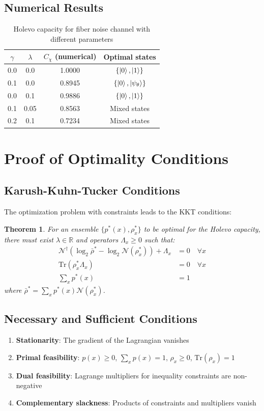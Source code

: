\documentclass[12pt]{article}
\begin{document}
\subsection{Numerical Results}
\begin{table}[h]
\centering
\begin{tabular}{|c|c|c|c|}
\hline
$\gamma$ & $\lambda$ & $C_{\chi}$ (numerical) & Optimal states \\
\hline
0.0 & 0.0 & 1.0000 & $\{\ket{0}, \ket{1}\}$ \\
0.1 & 0.0 & 0.8945 & $\{\ket{0}, \ket{\psi_\theta}\}$ \\
0.0 & 0.1 & 0.9886 & $\{\ket{0}, \ket{1}\}$ \\
0.1 & 0.05 & 0.8563 & Mixed states \\
0.2 & 0.1 & 0.7234 & Mixed states \\
\hline
\end{tabular}
\caption{Holevo capacity for fiber noise channel with different parameters}
\end{table}

\section{Proof of Optimality Conditions}

\subsection{Karush-Kuhn-Tucker Conditions}
The optimization problem with constraints leads to the KKT conditions:

\newtheorem{theorem}{Theorem}
\begin{theorem}
For an ensemble $\{p^*(x), \rho_x^*\}$ to be optimal for the Holevo capacity, there must exist $\lambda \in \mathbb{R}$ and operators $\Lambda_x \geq 0$ such that:
\begin{align}
\mathcal{N}^\dagger\left(\log_2 \bar{\rho}^* - \log_2 \mathcal{N}(\rho_x^*) \right) + \Lambda_x &= 0 \quad \forall x \\
\text{Tr}(\rho_x^* \Lambda_x) &= 0 \quad \forall x \\
\sum_x p^*(x) &= 1
\end{align}
where $\bar{\rho}^* = \sum_x p^*(x) \mathcal{N}(\rho_x^*)$.
\end{theorem}

\subsection{Necessary and Sufficient Conditions}
\begin{enumerate}
    \item \textbf{Stationarity}: The gradient of the Lagrangian vanishes
    \item \textbf{Primal feasibility}: $p(x) \geq 0$, $\sum_x p(x) = 1$, $\rho_x \geq 0$, $\text{Tr}(\rho_x) = 1$
    \item \textbf{Dual feasibility}: Lagrange multipliers for inequality constraints are non-negative
    \item \textbf{Complementary slackness}: Products of constraints and multipliers vanish
\end{enumerate}
\end{document}
